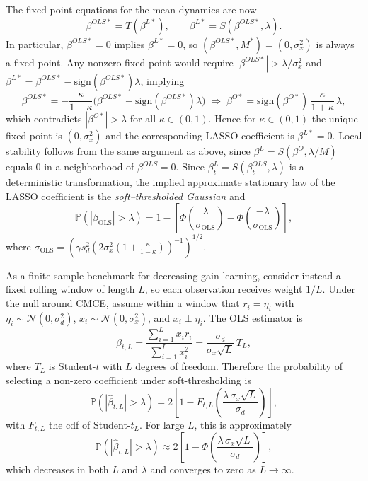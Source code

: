 \documentclass[11pt]{article}
\begin{document}
The fixed point equations for the mean dynamics are now
\[
\beta^{OLS*}=T(\beta^{L*}),\qquad \beta^{L*}=S(\beta^{OLS*},\lambda).
\]
In particular, $\beta^{OLS*}=0$ implies $\beta^{L*}=0$, so $(\beta^{OLS*},M^*)=(0,\sigma_x^2)$ is always a fixed point. Any nonzero fixed point would require $|\beta^{OLS*}|>\lambda/\sigma_x^2$ and $\beta^{L*}=\beta^{OLS*}-\mathrm{sign}(\beta^{OLS*})\lambda$, implying
\[
\beta^{OLS*}=-\frac{\kappa}{1-\kappa}\Big(\beta^{OLS*}-\mathrm{sign}(\beta^{OLS*})\lambda\Big)
\;\Rightarrow\;
\beta^{O*}=\mathrm{sign}(\beta^{O*})\,\frac{\kappa}{1+\kappa}\,\lambda,
\]
which contradicts $|\beta^{O*}|>\lambda$ for all $\kappa\in(0,1)$. Hence for $\kappa\in(0,1)$ the unique fixed point is $(0,\sigma_x^2)$ and the corresponding LASSO coefficient is $\beta^{L*}=0$. 
Local stability follows from the same argument as above, since $\beta^{L}=S(\beta^{O},\lambda/M)$ equals $0$ in a neighborhood of $\beta^{OLS}=0$.
Since $\beta^L_t=S(\beta^{OLS}_t,\lambda)$ is a deterministic transformation, the implied approximate stationary law of the LASSO coefficient is the \emph{soft--thresholded Gaussian} and 
\[ \mathbb{P}(|{\beta}_{\text{OLS}}| > \lambda) = 1 - \left[\Phi\left(\frac{\lambda}{\sigma_{\text{OLS}}}\right) - \Phi\left(\frac{-\lambda}{\sigma_{\text{OLS}}}\right)\right], \]
where $\sigma_{\text{OLS}} = \left(\gamma s_{d}^2 \left(2 \sigma^2_x \left(1 + \frac{\kappa}{1 - \kappa} \right)\right)^{-1}\right)^{1/2}$.

As a finite-sample benchmark for decreasing-gain learning, consider instead a fixed rolling window of length $L$, so each observation receives weight $1/L$. Under the null around CMCE, assume within a window that $r_i=\eta_i$ with $\eta_i\sim \mathcal N(0,\sigma_d^2)$, $x_i\sim \mathcal N(0,\sigma_x^2)$, and $x_i\perp \eta_i$. The OLS estimator is
\[
\hat\beta_{t,L}=\frac{\sum_{i=1}^{L} x_i r_i}{\sum_{i=1}^{L} x_i^2}
=\frac{\sigma_d}{\sigma_x\sqrt{L}}\,T_L,
\]
where $T_L$ is Student-$t$ with $L$ degrees of freedom. Therefore the probability of selecting a non-zero coefficient under soft-thresholding is
\[
\mathbb P\!\left(|\hat\beta_{t,L}|>\lambda\right)
=2\left[1-F_{t,L}\!\left(\frac{\lambda\,\sigma_x\sqrt{L}}{\sigma_d}\right)\right],
\]
with $F_{t,L}$ the cdf of Student-$t_L$. For large $L$, this is approximately
\[
\mathbb P\!\left(|\hat\beta_{t,L}|>\lambda\right)
\approx 2\left[1-\Phi\!\left(\frac{\lambda\,\sigma_x\sqrt{L}}{\sigma_d}\right)\right],
\]
which decreases in both $L$ and $\lambda$ and converges to zero as $L\to\infty$.

\end{document}

